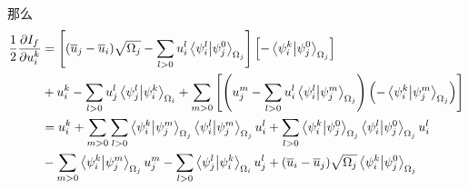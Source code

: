 \documentclass[UTF8,zihao=5]{ctexart} %
\newcommand*{\pd}[2]{\frac{\partial #1}{\partial #2}}
\newcommand*{\mean}[1]{\overline{#1}}
\begin{document}
那么
$$
    \begin{aligned}
        \frac{1}{2}\pd{I_f}{u_i^k}
         & =
        \left[
            (\mean{u}_j - \mean{u}_i)\sqrt{\Omega_j}
            - \sum_{l>0}u_i^l\innerproduct{\psi_i^l}{\psi_j^0}_{\Omega_j}
            \right]\left[
            - \innerproduct{\psi_i^k}{\psi_j^0}_{\Omega_j}
            \right]
        \\
         & +
        u_i^k
        - \sum_{l>0}u_j^l\innerproduct{\psi_j^l}{\psi_i^k}_{\Omega_i}
        +
        \sum_{m>0}
        \left[
            {\left(
                    u_j^m
                    - \sum_{l>0}u_i^l\innerproduct{\psi_i^l}{\psi_j^m}_{\Omega_j}
                    \right)\left(
                    - \innerproduct{\psi_i^k}{\psi_j^m}_{\Omega_j}
                    \right)}
        \right]                                           \\
         & =
        u_i^k +
        \sum_{m>0}\sum_{l>0}
        \innerproduct{\psi_i^k}{\psi_j^m}_{\Omega_j}
        \innerproduct{\psi_i^l}{\psi_j^m}_{\Omega_j}u_i^l +
        \sum_{l>0}\innerproduct{\psi_i^k}{\psi_j^0}_{\Omega_j}\innerproduct{\psi_i^l}{\psi_j^0}_{\Omega_j}u_i^l  \\
         &
        - \sum_{m>0}\innerproduct{\psi_i^k}{\psi_j^m}_{\Omega_j}u_j^m
        - \sum_{l>0}\innerproduct{\psi_j^l}{\psi_i^k}_{\Omega_i}u_j^l
        + (\mean{u}_i - \mean{u}_j)\sqrt{\Omega_j}\innerproduct{\psi_i^k}{\psi_j^0}_{\Omega_j}
    \end{aligned}
$$






{}
























\end{document}
